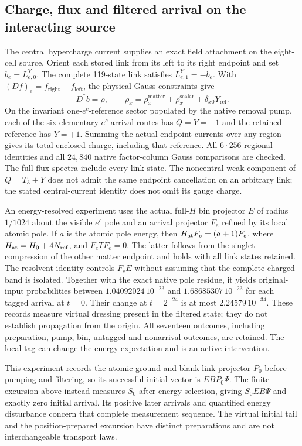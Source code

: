 \subsection{Charge, flux and filtered arrival on the interacting source}

The central hypercharge current supplies an exact field attachment on the
eight-cell source. Orient each stored link from its left to its right
endpoint and set $b_e=L^Y_{e,0}$. The complete 119-state link satisfies
$L^Y_{e,1}=-b_e$. With $(Df)_e=f_{\mathrm{right}}-f_{\mathrm{left}}$,
the physical Gauss constraints give
\[
 D^*b=\rho,\qquad
 \rho_x=\rho_x^{\mathrm{matter}}+\rho_x^{\mathrm{scalar}}
       +\delta_{x0}Y_{\mathrm{ref}}.
\]
On the invariant one-$e^c$-reference sector populated by the native removal
pump, each of the six elementary $e^c$ arrival routes has
$Q=Y=-1$ and the retained reference has $Y=+1$. Summing the actual
endpoint currents over any region gives its total enclosed charge,
including that reference. All $6\cdot256$ regional identities and all
$24{,}840$ native factor-column Gauss comparisons are checked. The full
flux spectra include every link state. The noncentral weak component of
$Q=T_3+Y$ does not admit the same endpoint cancellation on an arbitrary
link; the stated central-current identity does not omit its gauge charge.

An energy-resolved experiment uses the actual full-$H$ bin projector $E$
of radius $1/1024$ about the visible $e^c$ pole and an arrival projector
$F_e$ refined by its local atomic pole. If $a$ is the atomic pole energy,
then $H_{\rm at}F_e=(a+1)F_e$, where
$H_{\rm at}=H_0+4N_{\rm ref}$, and $F_eTF_e=0$. The latter follows from the
singlet compression of the other matter endpoint and holds with all link
states retained. The resolvent identity controls $F_eE$ without assuming
that the complete charged band is isolated. Together with the exact
native pole residue, it yields original-input probabilities between
$1.04092024\,10^{-23}$ and $1.68685307\,10^{-23}$ for each tagged
arrival at $t=0$. Their change at $t=2^{-24}$ is at most
$2.24579\,10^{-34}$. These records measure virtual dressing present in
the filtered state; they do not establish propagation from the origin.
All seventeen outcomes, including preparation, pump, bin, untagged and
nonarrival outcomes, are retained. The local tag can change the energy
expectation and is an active intervention.

This experiment records the atomic ground and blank-link projector $P_0$
before pumping and filtering, so its successful initial vector is
$EBP_0\Psi$. The finite excursion above instead measures $S_0$ after
energy selection, giving $S_0EB\Psi$ and exactly zero initial arrival.
Its positive later arrivals and quantified energy disturbance concern
that complete measurement sequence. The virtual initial tail and the
position-prepared excursion have distinct preparations and are not
interchangeable transport laws.

